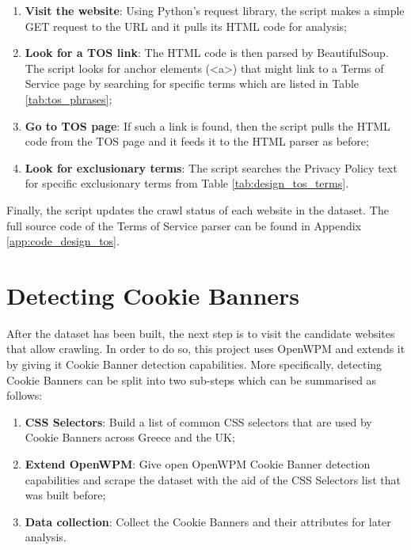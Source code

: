 \documentclass[../main.tex]{subfiles}
\begin{document}
\begin{enumerate}
    \item \textbf{Visit the website}: Using Python’s request library, the script makes a simple GET request to the URL and it pulls its HTML code for analysis;
    
    \item \textbf{Look for a TOS link}: The HTML code is then parsed by BeautifulSoup. The script looks for anchor elements (<a>) that might link to a Terms of Service page by searching for specific terms which are listed in Table \ref{tab:tos_phrases};

    \item \textbf{Go to TOS page}: If such a link is found, then the script pulls the HTML code from the TOS page and it feeds it to the HTML parser as before;

    \item \textbf{Look for exclusionary terms}: The script searches the Privacy Policy text for specific exclusionary terms from Table \ref{tab:design_tos_terms}.
\end{enumerate}

Finally, the script updates the crawl status of each website in the dataset. The full source code of the Terms of Service parser can be found in Appendix \ref{app:code_design_tos}.

\section{Detecting Cookie Banners}
After the dataset has been built, the next step is to visit the candidate websites that allow crawling. In order to do so, this project uses OpenWPM and extends it by giving it Cookie Banner detection capabilities. More specifically, detecting Cookie Banners can be split into two sub-steps which can be summarised as follows:

\begin{enumerate}
    \item \textbf{CSS Selectors}: Build a list of common CSS selectors that are used by Cookie Banners across Greece and the UK;

    \item \textbf{Extend OpenWPM}: Give open OpenWPM Cookie Banner detection capabilities and scrape the dataset with the aid of the CSS Selectors list that was built before; 

    \item \textbf{Data collection}: Collect the Cookie Banners and their attributes for later analysis.
\end{enumerate}
\end{document}
